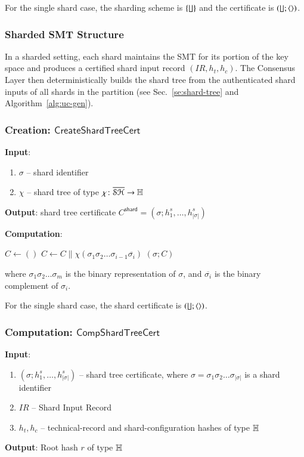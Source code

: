For the single shard case, the sharding scheme is $\{\lfloor\!\rfloor\}$ and the certificate is $(\lfloor\!\rfloor; \langle\rangle)$.

\subsubsection{Sharded SMT Structure}
In a sharded setting, each shard maintains the SMT for its portion of the key space and produces a certified shard input record $(IR, h_t, h_c)$. The Consensus Layer then deterministically builds the shard tree from the authenticated shard inputs of all shards in the partition (see Sec.~\ref{se:shard-tree} and Algorithm~\ref{alg:uc-gen}).

\subsubsection{Creation: $\mathsf{CreateShardTreeCert}$}\label{se:create-shard-tree-cert}

\textbf{Input}:
\begin{enumerate}
	\item $\sigma$ -- shard identifier
	\item $\chi$ -- shard tree of type $\chi \colon \overline{\mathcal{SH}}\to \mathbb{H}$
\end{enumerate}

\textbf{Output}: shard tree certificate $C^\mathsf{shard}=(\sigma; h^s_1, \ldots , h^s_{|\sigma|})$

\textbf{Computation}:
\begin{algorithmic}
	\State $C \gets ()$
		\State $C \gets C \mathbin{\|} \chi(\sigma_1\sigma_2\ldots\sigma_{i-1}\overline{\sigma_i})$
	\EndFor
	\State \Return $(\sigma; C)$
\end{algorithmic}

where $\sigma_1\sigma_2\ldots\sigma_m$ is the binary representation of $\sigma$, and $\overline{\sigma_i}$ is the binary complement of $\sigma_i$.

For the single shard case, the shard certificate is $(\lfloor\!\rfloor;\langle\rangle)$.

\subsubsection{Computation: $\mathsf{CompShardTreeCert}$}

\textbf{Input}:
\begin{enumerate}
	\item $(\sigma;h^s_1, \ldots, h^s_{|\sigma|})$ -- shard tree certificate, where $\sigma=\sigma_1\sigma_2\ldots \sigma_{|\sigma|}$ is a shard identifier
	\item $IR$ -- Shard Input Record
	\item $h_t,h_c$ -- technical-record and shard-configuration hashes of type $\mathbb{H}$
\end{enumerate}
\textbf{Output}: Root hash $r$ of type $\mathbb{H}$


